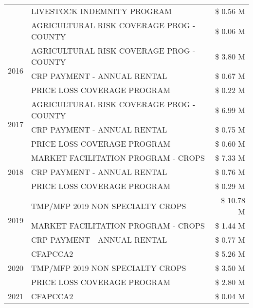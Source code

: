 \begin{tabular}{llr}
 & LIVESTOCK INDEMNITY PROGRAM & \$ 0.56 M \\
 & AGRICULTURAL RISK COVERAGE PROG - COUNTY & \$ 0.06 M \\
\cline{1-3}
\multirow[t]{3}{*}{2016} & AGRICULTURAL RISK COVERAGE PROG - COUNTY & \$ 3.80 M \\
 & CRP PAYMENT - ANNUAL RENTAL & \$ 0.67 M \\
 & PRICE LOSS COVERAGE PROGRAM & \$ 0.22 M \\
\cline{1-3}
\multirow[t]{3}{*}{2017} & AGRICULTURAL RISK COVERAGE PROG - COUNTY & \$ 6.99 M \\
 & CRP PAYMENT - ANNUAL RENTAL & \$ 0.75 M \\
 & PRICE LOSS COVERAGE PROGRAM & \$ 0.60 M \\
\cline{1-3}
\multirow[t]{3}{*}{2018} & MARKET FACILITATION PROGRAM - CROPS & \$ 7.33 M \\
 & CRP PAYMENT - ANNUAL RENTAL & \$ 0.76 M \\
 & PRICE LOSS COVERAGE PROGRAM & \$ 0.29 M \\
\cline{1-3}
\multirow[t]{3}{*}{2019} & TMP/MFP 2019 NON SPECIALTY CROPS & \$ 10.78 M \\
 & MARKET FACILITATION PROGRAM - CROPS & \$ 1.44 M \\
 & CRP PAYMENT - ANNUAL RENTAL & \$ 0.77 M \\
\cline{1-3}
\multirow[t]{3}{*}{2020} & CFAPCCA2 & \$ 5.26 M \\
 & TMP/MFP 2019 NON SPECIALTY CROPS & \$ 3.50 M \\
 & PRICE LOSS COVERAGE PROGRAM & \$ 2.80 M \\
\cline{1-3}
2021 & CFAPCCA2 & \$ 0.04 M \\
\cline{1-3}
\bottomrule
\end{tabular}
